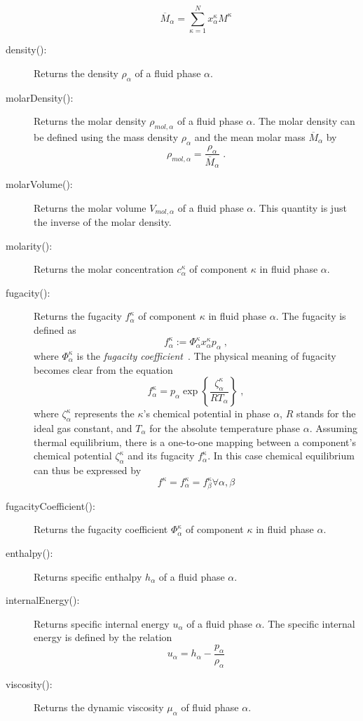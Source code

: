 \begin{description}
  \[
  \overline M_\alpha = \sum_{\kappa=1}^{N} x^\kappa_\alpha M^\kappa
  \]
\item[density():] Returns the density $\rho_\alpha$ of a
  fluid phase $\alpha$.
\item[molarDensity():] Returns the molar density
  $\rho_{mol,\alpha}$ of a fluid phase $\alpha$. The molar density can
  be defined using the mass density $\rho_\alpha$ and the mean molar mass $\overline M_\alpha$ by
  \[
  \rho_{mol,\alpha} = \frac{\rho_\alpha}{\overline M_\alpha} \;.
  \]
\item[molarVolume():] Returns the molar volume
  $V_{mol,\alpha}$ of a fluid phase $\alpha$. This quantity is just
  the inverse of the molar density.
\item[molarity():] Returns the molar concentration
  $c^\kappa_\alpha$ of component $\kappa$ in fluid
  phase $\alpha$.
\item[fugacity():] Returns the fugacity $f^\kappa_\alpha$ of
  component $\kappa$ in fluid phase $\alpha$. The fugacity is defined
  as
  \[
  f_\alpha^\kappa := \Phi^\kappa_\alpha x^\kappa_\alpha p_\alpha \;,
  \]
  where $\Phi^\kappa_\alpha$ is the {\em fugacity
    coefficient}~\cite{reid1987}.  The physical meaning of
  fugacity becomes clear from the equation
  \[
  f_\alpha^\kappa = p_\alpha \exp\left\{\frac{\zeta^\kappa_\alpha}{R T_\alpha} \right\} \;,
  \]
  where $\zeta^\kappa_\alpha$ represents the $\kappa$'s chemical
  potential in phase $\alpha$, $R$ stands for the
  ideal gas constant, and $T_\alpha$ for the absolute
  temperature phase $\alpha$. Assuming thermal equilibrium, there is a
  one-to-one mapping between a component's chemical potential
  $\zeta^\kappa_\alpha$ and its fugacity $f^\kappa_\alpha$. In this
  case chemical equilibrium can thus be expressed by
  \[
  f^\kappa = f^\kappa_\alpha = f^\kappa_\beta \forall \alpha, \beta
  \]
\item[fugacityCoefficient():] Returns the fugacity coefficient $\Phi^\kappa_\alpha$ of
  component $\kappa$ in fluid phase $\alpha$.
\item[enthalpy():] Returns specific enthalpy $h_\alpha$ of a
  fluid phase $\alpha$. 
\item[internalEnergy():] Returns specific internal energy $u_\alpha$ of a
  fluid phase $\alpha$. The specific internal energy is defined by the relation
  \[
  u_\alpha = h_\alpha - \frac{p_\alpha}{\rho_\alpha}
  \]
\item[viscosity():] Returns the dynamic viscosity
  $\mu_\alpha$ of fluid phase $\alpha$.
\end{description}
  
